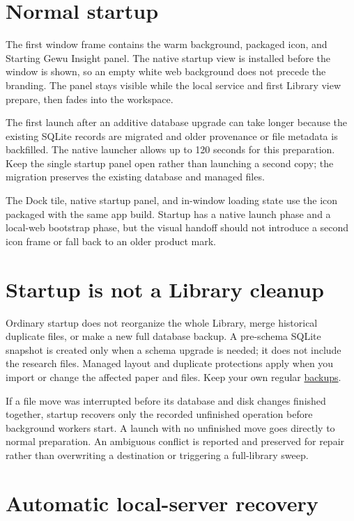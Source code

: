 \documentclass[10pt,letterpaper,oneside]{scrreprt}
\begin{document}
\section{Normal startup}\label{normal-startup}

The first window frame contains the warm background, packaged icon, and Starting Gewu Insight panel. The native startup view is installed before the window is shown, so an empty white web background does not precede the branding. The panel stays visible while the local service and first Library view prepare, then fades into the workspace.

The first launch after an additive database upgrade can take longer because the existing SQLite records are migrated and older provenance or file metadata is backfilled. The native launcher allows up to 120 seconds for this preparation. Keep the single startup panel open rather than launching a second copy; the migration preserves the existing database and managed files.

The Dock tile, native startup panel, and in-window loading state use the icon packaged with the same app build. Startup has a native launch phase and a local-web bootstrap phase, but the visual handoff should not introduce a second icon frame or fall back to an older product mark.

\section{Startup is not a Library cleanup}\label{startup-is-not-a-library-cleanup}

Ordinary startup does not reorganize the whole Library, merge historical duplicate files, or make a new full database backup. A pre-schema SQLite snapshot is created only when a schema upgrade is needed; it does not include the research files. Managed layout and duplicate protections apply when you import or change the affected paper and files. Keep your own regular \hyperref[backup-migrate]{backups}.

If a file move was interrupted before its database and disk changes finished together, startup recovers only the recorded unfinished operation before background workers start. A launch with no unfinished move goes directly to normal preparation. An ambiguous conflict is reported and preserved for repair rather than overwriting a destination or triggering a full-library sweep.

\section{Automatic local-server recovery}\label{automatic-local-server-recovery}
\end{document}
